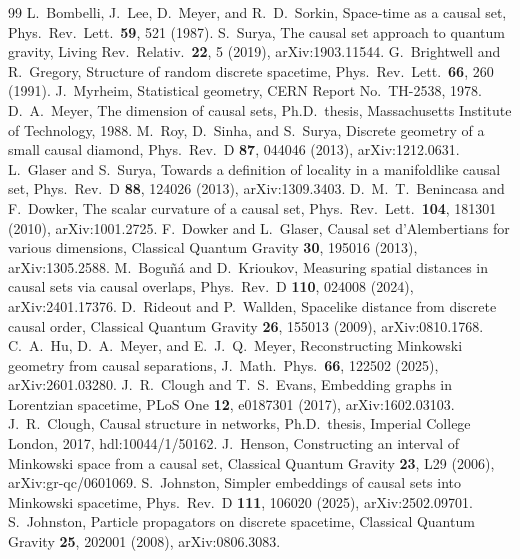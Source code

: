 \documentclass[prd,twocolumn,superscriptaddress,nofootinbib,amsmath,amssymb,floatfix]{revtex4-2}
\begin{document}
\begin{thebibliography}{99}
 L.~Bombelli, J.~Lee, D.~Meyer, and R.~D.~Sorkin, Space-time as a causal set, Phys.\ Rev.\ Lett.\ \textbf{59}, 521 (1987).
 S.~Surya, The causal set approach to quantum gravity, Living Rev.\ Relativ.\ \textbf{22}, 5 (2019), arXiv:1903.11544.
 G.~Brightwell and R.~Gregory, Structure of random discrete spacetime, Phys.\ Rev.\ Lett.\ \textbf{66}, 260 (1991).
 J.~Myrheim, Statistical geometry, CERN Report No.\ TH-2538, 1978.
 D.~A.~Meyer, The dimension of causal sets, Ph.D.\ thesis, Massachusetts Institute of Technology, 1988.
 M.~Roy, D.~Sinha, and S.~Surya, Discrete geometry of a small causal diamond, Phys.\ Rev.\ D \textbf{87}, 044046 (2013), arXiv:1212.0631.
 L.~Glaser and S.~Surya, Towards a definition of locality in a manifoldlike causal set, Phys.\ Rev.\ D \textbf{88}, 124026 (2013), arXiv:1309.3403.
 D.~M.~T.~Benincasa and F.~Dowker, The scalar curvature of a causal set, Phys.\ Rev.\ Lett.\ \textbf{104}, 181301 (2010), arXiv:1001.2725.
 F.~Dowker and L.~Glaser, Causal set d'Alembertians for various dimensions, Classical Quantum Gravity \textbf{30}, 195016 (2013), arXiv:1305.2588.
 M.~Bogu\~n\'a and D.~Krioukov, Measuring spatial distances in causal sets via causal overlaps, Phys.\ Rev.\ D \textbf{110}, 024008 (2024), arXiv:2401.17376.
 D.~Rideout and P.~Wallden, Spacelike distance from discrete causal order, Classical Quantum Gravity \textbf{26}, 155013 (2009), arXiv:0810.1768.
 C.~A.~Hu, D.~A.~Meyer, and E.~J.~Q.~Meyer, Reconstructing Minkowski geometry from causal separations, J.\ Math.\ Phys.\ \textbf{66}, 122502 (2025), arXiv:2601.03280.
 J.~R.~Clough and T.~S.~Evans, Embedding graphs in Lorentzian spacetime, PLoS One \textbf{12}, e0187301 (2017), arXiv:1602.03103.
 J.~R.~Clough, Causal structure in networks, Ph.D.\ thesis, Imperial College London, 2017, hdl:10044/1/50162.
 J.~Henson, Constructing an interval of Minkowski space from a causal set, Classical Quantum Gravity \textbf{23}, L29 (2006), arXiv:gr-qc/0601069.
 S.~Johnston, Simpler embeddings of causal sets into Minkowski spacetime, Phys.\ Rev.\ D \textbf{111}, 106020 (2025), arXiv:2502.09701.
 S.~Johnston, Particle propagators on discrete spacetime, Classical Quantum Gravity \textbf{25}, 202001 (2008), arXiv:0806.3083.

\end{thebibliography}
\end{document}
